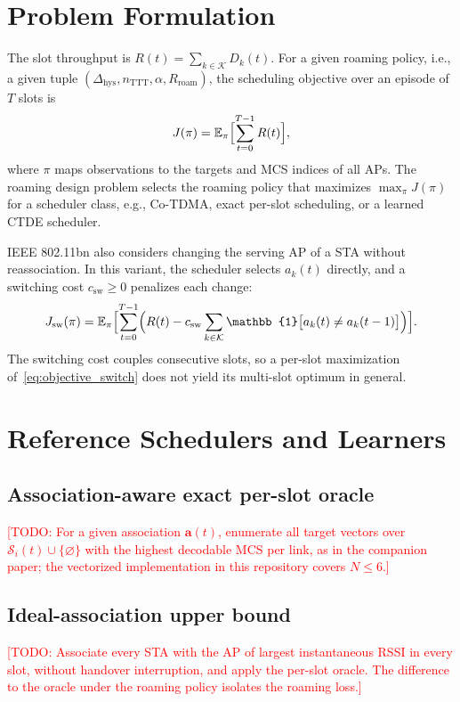 \documentclass{ieeeaccess}
\newcommand{\todo}[1]{\textcolor{red}{[TODO: #1]}}
\begin{document}
\section{Problem Formulation}
\label{sec:problem}
The slot throughput is $R(t) = \sum_{k \in \mathcal{K}} D_k(t)$. For a given roaming policy, i.e., a given tuple $(\Delta_{\text{hys}}, n_{\text{TTT}}, \alpha, R_{\text{roam}})$, the scheduling objective over an episode of $T$ slots is
\begin{equation}
J(\pi) = \mathbb{E}_{\pi}\Bigl[\sum_{t=0}^{T-1} R(t)\Bigr],
\label{eq:objective}
\end{equation}
where $\pi$ maps observations to the targets and MCS indices of all APs. The roaming design problem selects the roaming policy that maximizes $\max_{\pi} J(\pi)$ for a scheduler class, e.g., Co-TDMA, exact per-slot scheduling, or a learned CTDE scheduler.

IEEE 802.11bn also considers changing the serving AP of a STA without reassociation. In this variant, the scheduler selects $a_k(t)$ directly, and a switching cost $c_{\text{sw}} \ge 0$ penalizes each change:
\begin{equation}
J_{\text{sw}}(\pi) = \mathbb{E}_{\pi}\Bigl[\sum_{t=0}^{T-1} \Bigl(R(t) - c_{\text{sw}} \sum_{k \in \mathcal{K}} \mathbb{1}\bigl[a_k(t) \ne a_k(t-1)\bigr]\Bigr)\Bigr].
\label{eq:objective_switch}
\end{equation}
The switching cost couples consecutive slots, so a per-slot maximization of~\eqref{eq:objective_switch} does not yield its multi-slot optimum in general.

\section{Reference Schedulers and Learners}
\label{sec:method}
\subsection{Association-aware exact per-slot oracle}
\todo{For a given association $\mathbf{a}(t)$, enumerate all target vectors over $\mathcal{S}_i(t) \cup \{\varnothing\}$ with the highest decodable MCS per link, as in the companion paper; the vectorized implementation in this repository covers $N \le 6$.}

\subsection{Ideal-association upper bound}
\todo{Associate every STA with the AP of largest instantaneous RSSI in every slot, without handover interruption, and apply the per-slot oracle. The difference to the oracle under the roaming policy isolates the roaming loss.}
\end{document}
